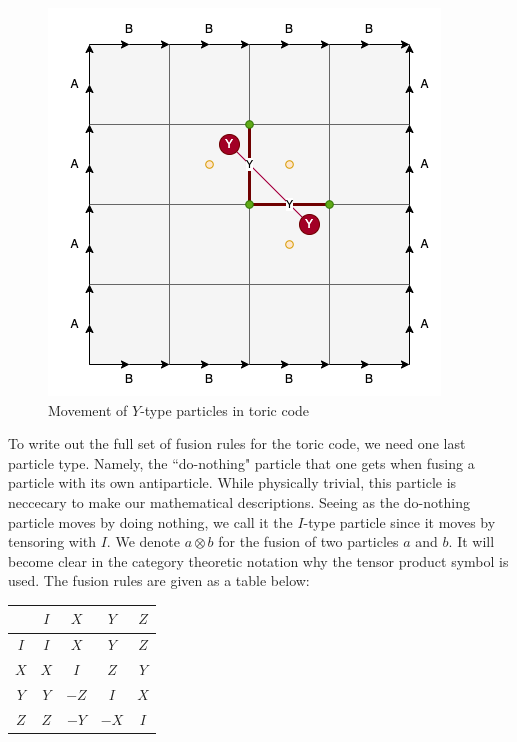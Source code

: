 \documentclass{article}
\theoremstyle{definition}
\numberwithin{figure}{section}
\begin{document}
\begin{figure}
\begin{center}
\includegraphics[scale=0.30]{Y-type}
\caption{Movement of $Y$-type particles in toric code}
\label{fig:Y-type}
\end{center}
\end{figure}

To write out the full set of fusion rules for the toric code, we need one last particle type. Namely, the ``do-nothing" particle that one gets when fusing a particle with its own antiparticle. While physically trivial, this particle is neccecary to make our mathematical descriptions. Seeing as the do-nothing particle moves by doing nothing, we call it the $I$-type particle since it moves by tensoring with $I$. We denote $a\otimes b$ for the fusion of two particles $a$ and $b$. It will become clear in the category theoretic notation why the tensor product symbol is used. The fusion rules are given as a table below:

\begin{center}
\begin{tabular}{c |c |c |c |c} 
  & $I$ & $X$ & $Y$ & $Z$ \\ [0.5ex] 
 \hline
 $I$ & $I$ & $X$ & $Y$ & $Z$ \\ 
 \hline
 $X$ & $X$ & $I$ & $Z$ & $Y$ \\
 \hline
 $Y$ & $Y$ & $-Z$ & $I$ & $X$ \\
 \hline
 $Z$ & $Z$ & $-Y$ & $-X$ & $I$
\end{tabular}
\end{center}
\end{document}
